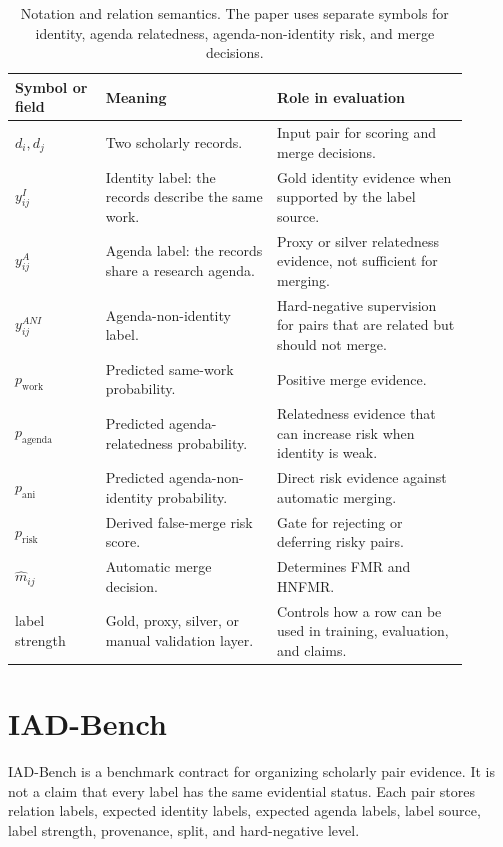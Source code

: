 \documentclass[11pt]{article}
\begin{document}
\begin{table}[H]
\caption{Notation and relation semantics. The paper uses separate symbols for identity, agenda relatedness, agenda-non-identity risk, and merge decisions.}
\label{tab:notation}
\centering
\small
\begin{tabular}{L{0.18\linewidth}L{0.34\linewidth}L{0.38\linewidth}}
\toprule
Symbol or field & Meaning & Role in evaluation \\
\midrule
$d_i,d_j$ & Two scholarly records. & Input pair for scoring and merge decisions. \\
$y^I_{ij}$ & Identity label: the records describe the same work. & Gold identity evidence when supported by the label source. \\
$y^A_{ij}$ & Agenda label: the records share a research agenda. & Proxy or silver relatedness evidence, not sufficient for merging. \\
$y^{ANI}_{ij}$ & Agenda-non-identity label. & Hard-negative supervision for pairs that are related but should not merge. \\
$p_{\mathrm{work}}$ & Predicted same-work probability. & Positive merge evidence. \\
$p_{\mathrm{agenda}}$ & Predicted agenda-relatedness probability. & Relatedness evidence that can increase risk when identity is weak. \\
$p_{\mathrm{ani}}$ & Predicted agenda-non-identity probability. & Direct risk evidence against automatic merging. \\
$p_{\mathrm{risk}}$ & Derived false-merge risk score. & Gate for rejecting or deferring risky pairs. \\
$\hat{m}_{ij}$ & Automatic merge decision. & Determines FMR and HNFMR. \\
label strength & Gold, proxy, silver, or manual validation layer. & Controls how a row can be used in training, evaluation, and claims. \\
\bottomrule
\end{tabular}
\end{table}

\section{IAD-Bench}

IAD-Bench is a benchmark contract for organizing scholarly pair evidence. It is not a claim that every label has the same evidential status. Each pair stores relation labels, expected identity labels, expected agenda labels, label source, label strength, provenance, split, and hard-negative level.
\end{document}
